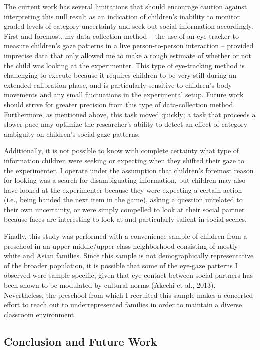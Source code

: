 \documentclass[,man,floatsintext]{apa6}
\begin{document}
The current work has several limitations that should encourage caution against interpreting this null result as an indication of children's inability to monitor graded levels of category uncertainty and seek out social information accordingly. First and foremost, my data collection method -- the use of an eye-tracker to measure children's gaze patterns in a live person-to-person interaction -- provided imprecise data that only allowed me to make a rough estimate of whether or not the child was looking at the experimenter. This type of eye-tracking method is challenging to execute because it requires children to be very still during an extended calibration phase, and is particularly sensitive to children's body movements and any small fluctuations in the experimental setup. Future work should strive for greater precision from this type of data-collection method. Furthermore, as mentioned above, this task moved quickly; a task that proceeds a slower pace may optimize the researcher's ability to detect an effect of category ambiguity on children's social gaze patterns.

Additionally, it is not possible to know with complete certainty what type of information children were seeking or expecting when they shifted their gaze to the experimenter. I operate under the assumption that children's foremost reason for looking was a search for disambiguating information, but children may also have looked at the experimenter because they were expecting a certain action (i.e., being handed the next item in the game), asking a question unrelated to their own uncertainty, or were simply compelled to look at their social partner because faces are interesting to look at and particularly salient in social scenes.

Finally, this study was performed with a convenience sample of children from a preschool in an upper-middle/upper class neighborhood consisting of mostly white and Asian families. Since this sample is not demographically representative of the broader population, it is possible that some of the eye-gaze patterns I observed were sample-specific, given that eye contact between social partners has been shown to be modulated by cultural norms (Akechi et al., 2013). Nevertheless, the preschool from which I recruited this sample makes a concerted effort to reach out to underrepresented families in order to maintain a diverse classroom environment.

\hypertarget{conclusion-and-future-work}{%
\subsection{Conclusion and Future Work}\label{conclusion-and-future-work}}
\end{document}
